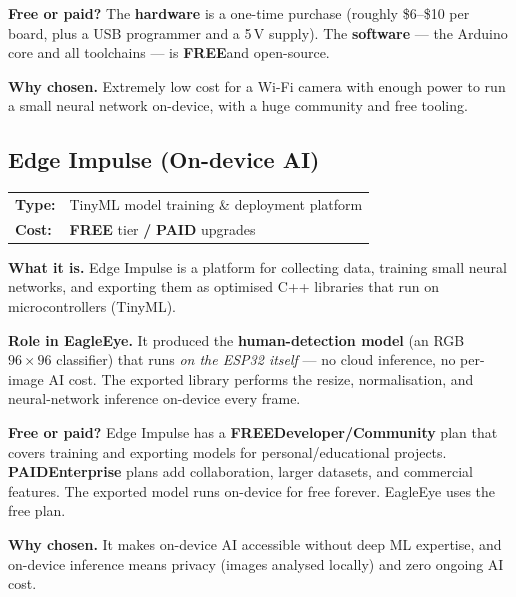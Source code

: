 \documentclass[11pt,a4paper]{article}
\makeatletter
\newcommand{\free}{\textbf{\color{freegreen}FREE}}
\newcommand{\paid}{\textbf{\color{paidorange}PAID}}
\newcommand{\freepaid}{\textbf{\color{freegreen}FREE} tier \textbf{/} \textbf{\color{paidorange}PAID} upgrades}
\newcommand{\techhead}[2]{\par\vspace{0.3em}\noindent
  \begin{tabularx}{\linewidth}{@{}lX@{}}
  \textbf{Type:} & #1 \\
  \textbf{Cost:} & #2 \\
  \end{tabularx}\par\vspace{0.3em}}
\makeatother
\begin{document}
\textbf{Free or paid?} The \textbf{hardware} is a one-time purchase (roughly \$6--\$10 per
board, plus a USB programmer and a 5\,V supply). The \textbf{software} --- the Arduino core and
all toolchains --- is \free and open-source.

\textbf{Why chosen.} Extremely low cost for a Wi-Fi camera with enough power to run a small
neural network on-device, with a huge community and free tooling.

\subsection{Edge Impulse (On-device AI)}
\techhead{TinyML model training \& deployment platform}{\freepaid}
\textbf{What it is.} Edge Impulse is a platform for collecting data, training small neural
networks, and exporting them as optimised C++ libraries that run on microcontrollers (TinyML).

\textbf{Role in EagleEye.} It produced the \textbf{human-detection model} (an RGB
$96\times96$ classifier) that runs \emph{on the ESP32 itself} --- no cloud inference, no
per-image AI cost. The exported library performs the resize, normalisation, and neural-network
inference on-device every frame.

\textbf{Free or paid?} Edge Impulse has a \free \textbf{Developer/Community} plan that covers
training and exporting models for personal/educational projects. \paid \textbf{Enterprise}
plans add collaboration, larger datasets, and commercial features. The exported model runs
on-device for free forever. EagleEye uses the free plan.

\textbf{Why chosen.} It makes on-device AI accessible without deep ML expertise, and on-device
inference means privacy (images analysed locally) and zero ongoing AI cost.

\end{document}
